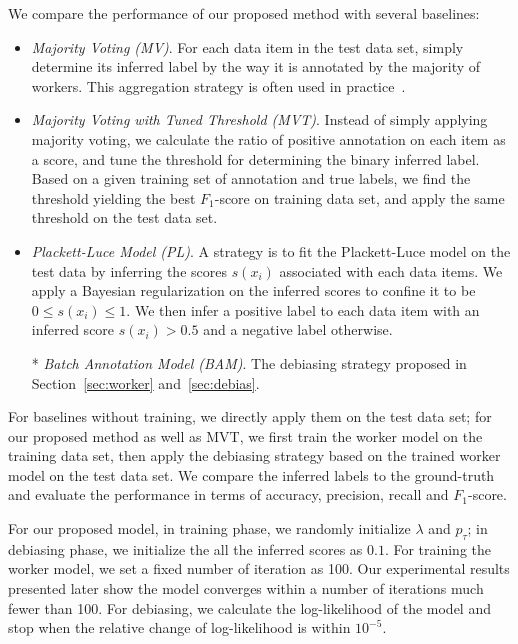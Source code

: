 We compare the performance of our proposed method with several baselines:
\begin{itemize}
  \item \emph{Majority Voting (MV)}.
        For each data item in the test data set, 
        simply determine its inferred label by the way it is annotated by the majority of workers.  
        This aggregation strategy is often used in practice~\cite{sheng:kdd2008}.  %
  \item \emph{Majority Voting with Tuned Threshold (MVT)}.
        Instead of simply applying majority voting, 
        we calculate the ratio of positive annotation on each item as a score, 
        and tune the threshold for determining the binary inferred label.  
        Based on a given training set of annotation and true labels, 
        we find the threshold yielding the best $F_1$-score on training data set, 
        and apply the same threshold on the test data set.  
  \item \emph{Plackett-Luce Model (PL)}.  
        A strategy is to fit the Plackett-Luce model on the test data by inferring the scores $s(x_i)$ associated with each data items.  
        We apply a Bayesian regularization on the inferred scores to confine it to be $0 \leq s(x_i) \leq 1$.  
        We then infer a positive label to each data item with an inferred score $s(x_i) > 0.5$ and a negative label otherwise.  
  \item[*] \emph{Batch Annotation Model (BAM)}.  
        The debiasing strategy proposed in Section~\ref{sec:worker} and~\ref{sec:debias}.
\end{itemize}

For baselines without training, we directly apply them on the test data set; 
for our proposed method as well as MVT, we first train the worker model on the training data set, 
then apply the debiasing strategy based on the trained worker model on the test data set.  
We compare the inferred labels to the ground-truth and evaluate the performance in terms of accuracy, precision, recall and $F_1$-score.  

For our proposed model, 
in training phase, we randomly initialize $\lambda$ and $p_{\tau}$;
in debiasing phase, we initialize the all the inferred scores as $0.1$. 
For training the worker model, we set a fixed number of iteration as 100.  
Our experimental results presented later show the model converges within 
a number of iterations much fewer than 100.  
For debiasing, we calculate the log-likelihood of the model and stop when the relative change of log-likelihood is within $10^{-5}$.  



